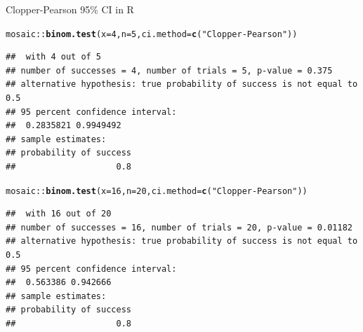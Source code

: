 \documentclass[10pt]{beamer}\usepackage[]{graphicx}\usepackage[]{color}
\makeatletter
\newcommand{\hlnum}[1]{\textcolor[rgb]{0.686,0.059,0.569}{#1}}%
\newcommand{\hlstr}[1]{\textcolor[rgb]{0.192,0.494,0.8}{#1}}%
\newcommand{\hlopt}[1]{\textcolor[rgb]{0,0,0}{#1}}%
\newcommand{\hlstd}[1]{\textcolor[rgb]{0.345,0.345,0.345}{#1}}%
\newcommand{\hlkwc}[1]{\textcolor[rgb]{0.333,0.667,0.333}{#1}}%
\newcommand{\hlkwd}[1]{\textcolor[rgb]{0.737,0.353,0.396}{\textbf{#1}}}%
\newenvironment{kframe}{%
 \def\at@end@of@kframe{}%
 \ifinner\ifhmode%
  \def\at@end@of@kframe{\end{minipage}}%
  \begin{minipage}{\columnwidth}%
 \fi\fi%
 \def\FrameCommand##1{\hskip\@totalleftmargin \hskip-\fboxsep
 \colorbox{shadecolor}{##1}\hskip-\fboxsep
     \hskip-\linewidth \hskip-\@totalleftmargin \hskip\columnwidth}%
 \MakeFramed {\advance\hsize-\width
   \@totalleftmargin\z@ \linewidth\hsize
   \@setminipage}}%
 {\par\unskip\endMakeFramed%
 \at@end@of@kframe}
\newenvironment{knitrout}{}{} %
\makeatother
\begin{document}
\begin{frame}[fragile]{Clopper-Pearson 95\% CI in R}
\begin{knitrout}\tiny
{}\color{fgcolor}\begin{kframe}
\begin{alltt}
\hlstd{mosaic}\hlopt{::}\hlkwd{binom.test}\hlstd{(}\hlkwc{x}\hlstd{=}\hlnum{4}\hlstd{,} \hlkwc{n}\hlstd{=}\hlnum{5}\hlstd{,} \hlkwc{ci.method}\hlstd{=}\hlkwd{c}\hlstd{(}\hlstr{"Clopper-Pearson"}\hlstd{))}
\end{alltt}
\begin{verbatim}
##  with 4 out of 5 
## number of successes = 4, number of trials = 5, p-value = 0.375
## alternative hypothesis: true probability of success is not equal to 0.5 
## 95 percent confidence interval:
##  0.2835821 0.9949492 
## sample estimates:
## probability of success 
##                    0.8
\end{verbatim}
\begin{alltt}
\hlstd{mosaic}\hlopt{::}\hlkwd{binom.test}\hlstd{(}\hlkwc{x}\hlstd{=}\hlnum{16}\hlstd{,} \hlkwc{n}\hlstd{=}\hlnum{20}\hlstd{,} \hlkwc{ci.method}\hlstd{=}\hlkwd{c}\hlstd{(}\hlstr{"Clopper-Pearson"}\hlstd{))}
\end{alltt}
\begin{verbatim}
##  with 16 out of 20 
## number of successes = 16, number of trials = 20, p-value = 0.01182
## alternative hypothesis: true probability of success is not equal to 0.5 
## 95 percent confidence interval:
##  0.563386 0.942666 
## sample estimates:
## probability of success 
##                    0.8
\end{verbatim}
\end{kframe}
\end{knitrout}
\end{frame}
\end{document}
